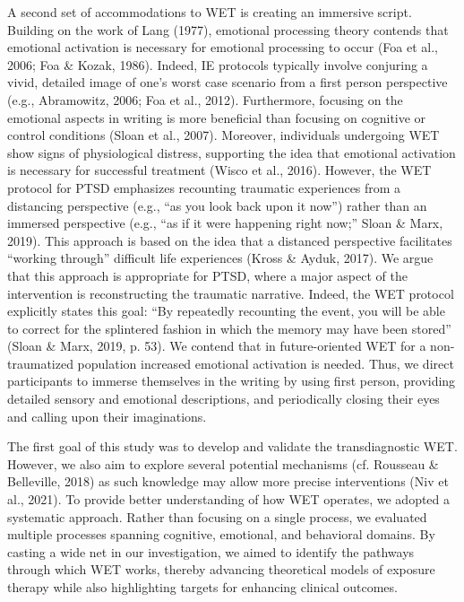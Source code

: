 \documentclass[
  man,floatsintext]{apa7}
\begin{document}
A second set of accommodations to WET is creating an immersive script.
Building on the work of Lang (1977), emotional processing theory contends that
emotional activation is necessary for emotional processing to occur (Foa et al., 2006; Foa \& Kozak, 1986).
Indeed, IE protocols typically involve conjuring a vivid, detailed image of one's worst case scenario from a first person perspective (e.g., Abramowitz, 2006; Foa et al., 2012).
Furthermore, focusing on the emotional aspects in writing is more beneficial than focusing on cognitive or control conditions (Sloan et al., 2007).
Moreover, individuals undergoing WET show signs of physiological distress, supporting the idea that emotional activation is necessary for successful treatment (Wisco et al., 2016).
However, the WET protocol for PTSD emphasizes recounting traumatic experiences from a distancing perspective (e.g., ``as you look back upon it now'') rather than an immersed perspective (e.g., ``as if it were happening right now;'' Sloan \& Marx, 2019).
This approach is based on the idea that a distanced perspective facilitates ``working through'' difficult life experiences (Kross \& Ayduk, 2017).
We argue that this approach is appropriate for PTSD, where a major aspect of the intervention is reconstructing the traumatic narrative.
Indeed, the WET protocol explicitly states this goal: ``By repeatedly recounting the event, you will be able to correct for the splintered fashion in which the memory may have been stored'' (Sloan \& Marx, 2019, p. 53).
We contend that in future-oriented WET for a non-traumatized population increased emotional activation is needed.
Thus, we direct participants to immerse themselves in the writing by using first person, providing detailed sensory and emotional descriptions, and periodically closing their eyes and calling upon their imaginations.

The first goal of this study was to develop and validate the transdiagnostic WET.
However, we also aim to explore several potential mechanisms (cf. Rousseau \& Belleville, 2018) as such knowledge may allow more precise interventions (Niv et al., 2021).
To provide better understanding of how WET operates, we adopted a systematic approach.
Rather than focusing on a single process, we evaluated multiple processes spanning cognitive, emotional, and behavioral domains.
By casting a wide net in our investigation, we aimed to identify the pathways through which WET works, thereby advancing theoretical models of exposure therapy while also highlighting targets for enhancing clinical outcomes.
\end{document}
